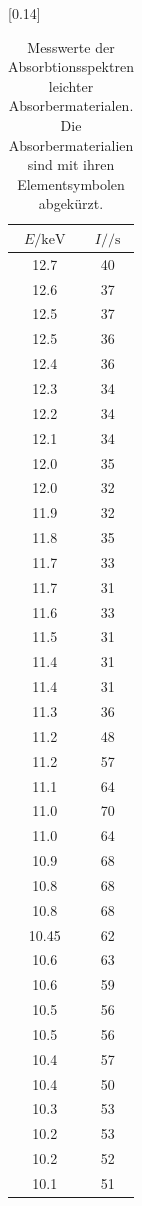 \begin{table}[h! p]
  \centering
  \caption{Messwerte der Absorbtionsspektren leichter Absorbermaterialen. Die Absorbermaterialien
  sind mit ihren Elementsymbolen abgekürzt.}
  \label{tab:11}
  [0.14\textwidth]{
  \begin{tabular}{c c|}
    \toprule
    $E / \si{\kilo\electronvolt}$ & $I / \si{\per\second}$ \\
    \midrule
    12.7 & 40 \\
    12.6 & 37 \\
    12.5 & 37 \\
    12.5 & 36 \\
    12.4 & 36 \\
    12.3 & 34 \\
    12.2 & 34 \\
    12.1 & 34 \\
    12.0 & 35 \\
    12.0 & 32 \\
    11.9 & 32 \\
    11.8 & 35 \\
    11.7 & 33 \\
    11.7 & 31 \\
    11.6 & 33 \\
    11.5 & 31 \\
    11.4 & 31 \\
    11.4 & 31 \\
    11.3 & 36 \\
    11.2 & 48 \\
    11.2 & 57 \\
    11.1 & 64 \\
    11.0 & 70 \\
    11.0 & 64 \\
    10.9 & 68 \\
    10.8 & 68 \\
    10.8 & 68 \\
    10.45 & 62 \\
    10.6 & 63 \\
    10.6 & 59 \\
    10.5 & 56 \\
    10.5 & 56 \\
    10.4 & 57 \\
    10.4 & 50 \\
    10.3 & 53 \\
    10.2 & 53 \\
    10.2 & 52 \\
    10.1 & 51 \\

\end{tabular}}
\end{table}
